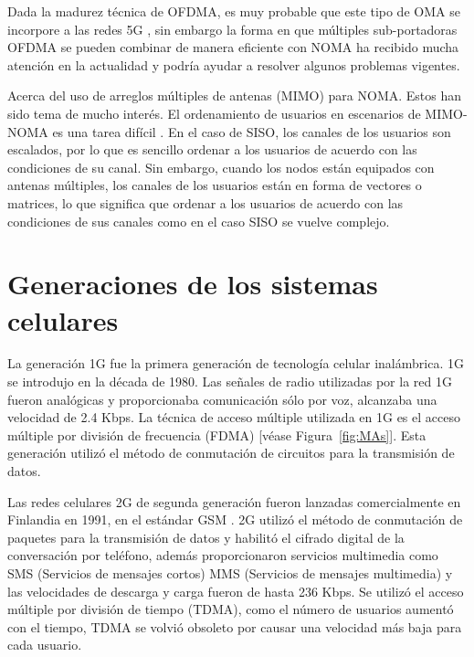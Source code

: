 Dada la madurez técnica de OFDMA, es muy probable que este tipo de OMA se incorpore a las redes 5G \parencite{DIng2017}, sin embargo la forma en que múltiples sub-portadoras OFDMA se pueden combinar de manera eficiente con NOMA ha recibido mucha atención en la actualidad y podría ayudar a resolver algunos problemas vigentes.\newline

Acerca del uso de arreglos múltiples de antenas (MIMO) para NOMA. Estos han sido tema de mucho interés. El ordenamiento de usuarios en escenarios de MIMO-NOMA es una tarea difícil \parencite{DIng2017}. En el caso de SISO, los canales de los usuarios son escalados, por lo que es sencillo ordenar a los usuarios de acuerdo con las condiciones de su canal. Sin embargo, cuando los nodos están equipados con antenas múltiples, los canales de los usuarios están en forma de vectores o matrices, lo que significa que ordenar a los usuarios de acuerdo con las condiciones de sus canales como en el caso SISO se vuelve complejo.


\section{Generaciones de los sistemas celulares}

La generación 1G fue la primera generación de tecnología celular inalámbrica. 1G se introdujo en la década de 1980. Las señales de radio utilizadas por la red 1G fueron analógicas y proporcionaba comunicación sólo por voz, alcanzaba una velocidad de 2.4 Kbps. La técnica de acceso múltiple utilizada en 1G es el acceso múltiple por división de frecuencia (FDMA) [véase Figura~\ref{fig:MAs}]\parencite{Nair2018}. Esta generación utilizó el método de conmutación de circuitos para la transmisión de datos. \newline

Las redes celulares 2G de segunda generación fueron lanzadas comercialmente en Finlandia en 1991, en el estándar GSM \parencite{Nair2018}. 2G utilizó el método de conmutación de paquetes para la transmisión de datos y habilitó el cifrado digital de la conversación por teléfono, además proporcionaron servicios multimedia como SMS (Servicios de mensajes cortos) MMS (Servicios de mensajes multimedia) y las velocidades de descarga y carga fueron de hasta 236 Kbps. Se utilizó el acceso múltiple por división de tiempo (TDMA), como el número de usuarios aumentó con el tiempo, TDMA se volvió obsoleto por causar una velocidad más baja para cada usuario.\newline

